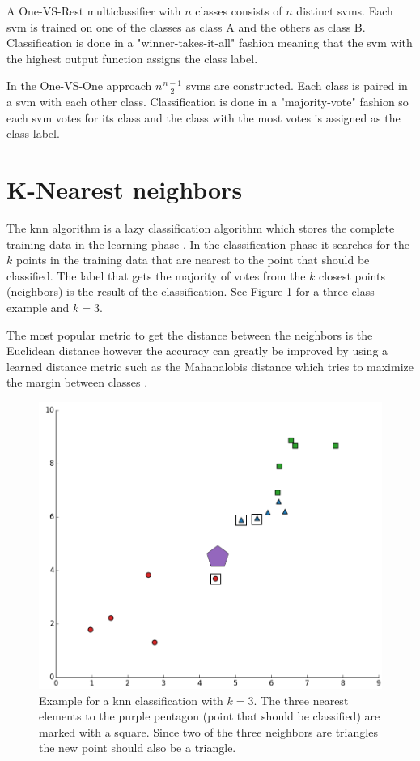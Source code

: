 A One-VS-Rest multiclassifier with $n$ classes consists of $n$ distinct \glspl{svm}. Each \gls{svm} is trained on one of the classes as class A and the others as class B. Classification is done in a "winner-takes-it-all" fashion meaning that the \gls{svm} with the highest output function assigns the class label.

In the One-VS-One approach $n\frac{n-1}{2}$ \glspl{svm} are constructed. Each class is paired in a \gls{svm} with each other class. Classification is done in a "majority-vote" fashion so each \gls{svm} votes for its class and the class with the most votes is assigned as the class label.

\section{K-Nearest neighbors}
The \gls{knn} algorithm is a lazy classification algorithm which stores the complete training data in the learning phase \cite{Keller1985}. In the classification phase it searches for the $k$ points in the training data that are nearest to the point that should be classified. The label that gets the majority of votes from the $k$ closest points {(neighbors)} is the result of the classification. See Figure \ref{fig:knn3} for a three class example and $k=3$. 

The most popular metric to get the distance between the neighbors is the Euclidean distance however the accuracy can greatly be improved by using a learned distance metric such as the Mahanalobis distance which tries to maximize the margin between classes \cite{Weinberger2005}. 

\begin{figure}[ht]
	\centering
	\includegraphics[scale=0.45]{figures/theoryKNN_3}
	\caption{Example for a knn classification with $k=3$. The three nearest elements to the purple pentagon {(point that should be classified)} are marked with a square. Since two of the three neighbors are triangles the new point should also be a triangle.}
	\label{fig:knn3}
\end{figure}

